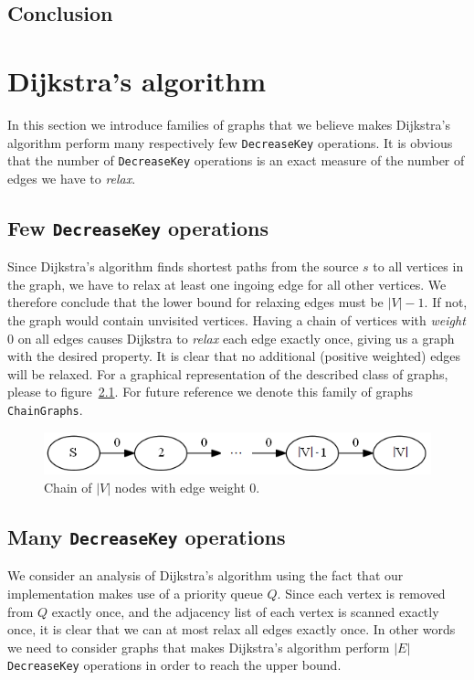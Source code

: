 \documentclass[a4paper,oneside,article,11pt]{memoir}
\begin{document}
\section{Conclusion}

\chapter{Dijkstra's algorithm}
In this section we introduce families of graphs that we believe makes Dijkstra's algorithm perform many respectively few \texttt{DecreaseKey} operations. It is obvious that the number of \texttt{DecreaseKey} operations is an exact measure of the number of edges we have to \textit{relax}.

\section{Few \texttt{DecreaseKey} operations}
\label{sec:few_decreasekey}
Since Dijkstra's algorithm finds shortest paths from the source $s$ to all vertices in the graph, we have to relax at least one ingoing edge for all other vertices. We therefore conclude that the lower bound for relaxing edges must be $\vert V \vert -1$. If not, the graph would contain unvisited vertices. Having a chain of vertices with \textit{weight} 0 on all edges causes Dijkstra to \textit{relax} each edge exactly once, giving us a graph with the desired property. It is clear that no additional (positive weighted) edges will be relaxed. For a graphical representation of the described class of graphs, please to figure~\ref{figure:graph_chain}. For future reference we denote this family of graphs \texttt{ChainGraphs}.

\begin{figure}[H]
\centering
\centerline {
  \includegraphics[scale=1]{../figures/graph_chain.png}
}
\caption{Chain of $\vert V \vert$ nodes with edge weight 0.}
\label{figure:graph_chain}
\end{figure}

\section{Many \texttt{DecreaseKey} operations}
\label{sec:many_decreasekey}
We consider an analysis of Dijkstra's algorithm using the fact that our implementation makes use of a priority queue $Q$. Since each vertex is removed from $Q$ exactly once, and the adjacency list of each vertex is scanned exactly once, it is clear that we can at most relax all edges exactly once.
In other words we need to consider graphs that makes Dijkstra's algorithm perform $\vert E \vert$ \texttt{DecreaseKey} operations in order to reach the upper bound.
\end{document}

